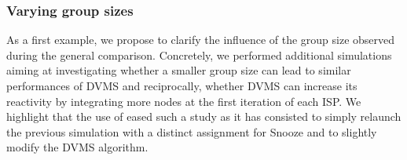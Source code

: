 \subsubsection{Varying group sizes}

As a first example, we propose to clarify the influence of the group
size observed during the general comparison.
Concretely, we performed additional simulations aiming at
investigating whether a smaller group size can lead to similar
performances of DVMS and reciprocally, whether DVMS can increase its
reactivity by integrating more nodes at the first iteration of each
ISP. We highlight that the use of \vmps eased such a study as it has consisted
to simply relaunch the previous simulation with a distinct
assignment for Snooze and to slightly modify the DVMS algorithm.


\begin{figure}
\subcapcentertrue
{}
\begin{minipage}{.66\textwidth}\centering
  \vspace*{-4.5cm}
\end{minipage}
\end{figure}

